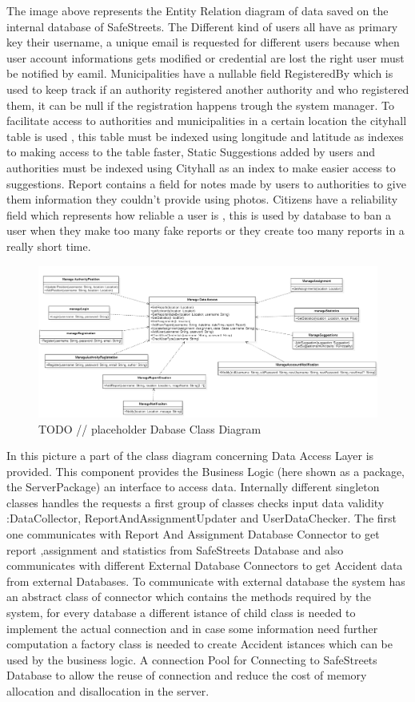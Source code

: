 The image above represents the Entity Relation diagram of data saved on the internal database of SafeStreets. The Different kind of users all have as primary key their username, a unique email is requested for different users because when user account informations gets modified or credential are lost the right user must be notified by eamil. Municipalities have a nullable field RegisteredBy which is used to keep track if an authority registered another authority and who registered them, it can be null if the registration happens trough the system manager. To facilitate access to authorities and municipalities in a certain location the cityhall table is used , this table must be indexed using longitude and latitude as indexes to making access to the table faster,
Static Suggestions added by users and authorities must be indexed using Cityhall as an index to make easier access to suggestions.
Report contains a field for notes made by users to authorities to give them information they couldn't provide using photos.
Citizens have a reliability field which represents how reliable a user is , this is used by database to ban a user when they make too many fake reports or they create too many reports in a really short time.
\begin{figure}[H]
\centering
\includegraphics[width=\textwidth]{Images/Interfaces.png}
\caption{\label{fig:ComWI}TODO // placeholder Dabase Class Diagram }
\end{figure}
In this picture a part of the class diagram concerning Data Access Layer is provided.
This component provides the Business Logic (here shown as a package, the ServerPackage) an interface to access data.
Internally different singleton classes handles the requests a first group of classes checks input data validity :DataCollector, ReportAndAssignmentUpdater and UserDataChecker. The first one communicates with Report And Assignment Database Connector to get report ,assignment and statistics from SafeStreets Database and also communicates with different External Database Connectors to get Accident data from external Databases. To communicate with external database the system has an abstract class of connector which contains the methods required by the system, for every database a different istance of child class  is needed to implement the actual connection and in case some information need further computation a factory class is needed to create Accident istances which can be used by the business logic. A connection Pool for Connecting to SafeStreets Database to allow the reuse of connection and reduce the cost of memory allocation and disallocation in the server.
